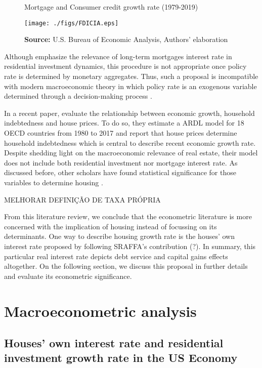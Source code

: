 \documentclass[11pt]{article}
\begin{document}
\begin{figure}[htb]
	\centering
	\caption{Mortgage and Consumer credit growth rate (1979-2019)}
	\label{Fig:CreditFDICIA}
	\texttt{[image: ./figs/FDICIA.eps]}
	\caption*{\textbf{Source:} U.S. Bureau of Economic Analysis, Authors' elaboration}
\end{figure}

Although \textcite{gauger_residential_2003} emphasize the relevance of long-term mortgages interest rate in residential investment dynamics, this procedure is not appropriate once policy rate is determined by monetary aggregates.
Thus, such a proposal is incompatible with modern macroeconomic theory in which policy rate is an exogenous variable determined through a decision-making process \cite[p.~230--256]{lavoie_post-keynesian_2015}.

In a recent paper, \textcite{wood_house_2020} evaluate the relationship between economic growth, household indebtedness and house prices.
To do so, they estimate a ARDL model for 18 OECD countries from 1980 to 2017 and report that house prices determine household indebtedness which is central to describe recent economic growth rate.
Despite shedding light on the macroeconomic relevance of real estate, their model does not include both residential investment nor mortgage interest rate.
As discussed before, other scholars have found statistical significance for those variables to determine housing \cite{gauger_residential_2003}.



MELHORAR DEFINIÇÃO DE TAXA PRÓPRIA

From this literature review, we conclude that the econometric literature is more concerned with the implication of housing instead of focussing on its determinants.
One way to describe housing growth rate is the houses' own interest rate proposed by \textcite{teixeira_crescimento_2015} following SRAFFA's contribution (?).
In summary, this particular real interest rate depicts debt service and capital gains effects altogether.
On the following section, we discuss this proposal in further details and evaluate its econometric significance.



\section{Macroeconometric analysis}
\label{sec:org69ed4ca}
\label{sec:VECM}
\subsection{Houses' own interest rate and residential investment growth rate in the US	Economy}
\label{sec:org3822576}
\label{sc:own}
\end{document}
